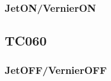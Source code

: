 \documentclass[12pt]{article}
\begin{document}
\subsubsection{JetON/VernierON}

\subsection{\textbf{TC060}}\label{sec:TC060}

\subsubsection{JetOFF/VernierOFF}
\end{document}
